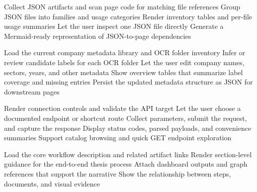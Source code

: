 \begin{algorithm}[H]
Collect JSON artifacts and scan page code for matching file references\;
Group JSON files into families and usage categories\;
Render inventory tables and per-file usage summaries\;
Let the user inspect one JSON file directly\;
Generate a Mermaid-ready representation of JSON-to-page dependencies\;
\caption{JSON Ontology Usage Map}
\label{alg:json-ontology-usage-map}
\end{algorithm}

\begin{algorithm}[H]
Load the current company metadata library and OCR folder inventory\;
Infer or review candidate labels for each OCR folder\;
Let the user edit company names, sectors, years, and other metadata\;
Show overview tables that summarize label coverage and missing entries\;
Persist the updated metadata structure as JSON for downstream pages\;
\caption{OCR Company Metadata Labeler}
\label{alg:ocr-company-metadata-labeler}
\end{algorithm}

\begin{algorithm}[H]
Render connection controls and validate the API target\;
Let the user choose a documented endpoint or shortcut route\;
Collect parameters, submit the request, and capture the response\;
Display status codes, parsed payloads, and convenience summaries\;
Support catalog browsing and quick GET endpoint exploration\;
\caption{Sustainable Framework API Reader}
\label{alg:framework-api-reader}
\end{algorithm}

\begin{algorithm}[H]
Load the core workflow description and related artifact links\;
Render section-level guidance for the end-to-end thesis process\;
Attach dashboard outputs and graph references that support the narrative\;
Show the relationship between steps, documents, and visual evidence\;
\caption{Thesis Systematic Workflow Narrative}
\label{alg:thesis-systematic-workflow}
\end{algorithm}

